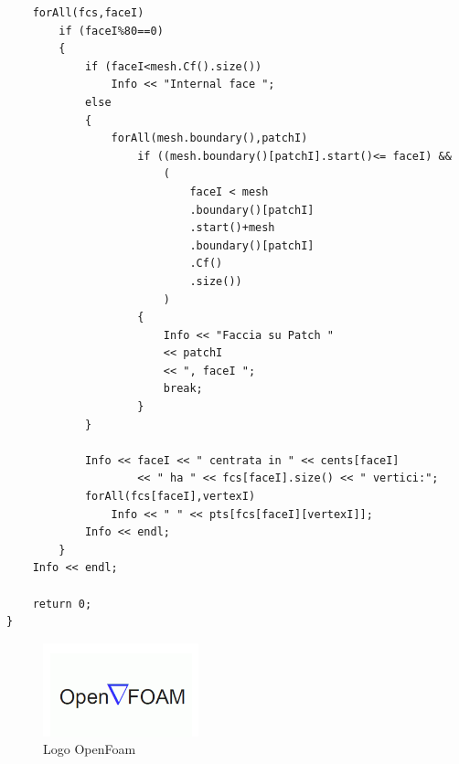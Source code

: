\begin{verbatim}
    forAll(fcs,faceI)
        if (faceI%80==0)
        {
            if (faceI<mesh.Cf().size())
                Info << "Internal face ";
            else
            {
                forAll(mesh.boundary(),patchI)
                    if ((mesh.boundary()[patchI].start()<= faceI) &&
                        (
                            faceI < mesh
                            .boundary()[patchI]
                            .start()+mesh
                            .boundary()[patchI]
                            .Cf()
                            .size())
                        )
                    {
                        Info << "Faccia su Patch " 
                        << patchI 
                        << ", faceI ";
                        break;
                    }
            }

            Info << faceI << " centrata in " << cents[faceI]
                    << " ha " << fcs[faceI].size() << " vertici:";
            forAll(fcs[faceI],vertexI)
                Info << " " << pts[fcs[faceI][vertexI]];
            Info << endl;
        }
    Info << endl;

    return 0;
}
    \end{verbatim}
    \begin{figure}[H]
        \centering
        \includegraphics[width=0.4\textwidth]{figure/openfoam.png}
        \caption{Logo OpenFoam}
    \end{figure}

